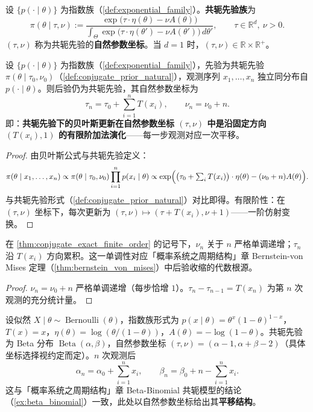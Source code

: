 \begin{definition}[共轭先验与自然参数坐标]\label{def:conjugate_prior_natural}
设 $\{p(\cdot\mid\theta)\}$ 为指数族（\cref{def:exponential_family}）。\textbf{共轭先验族}为
\[
\pi(\theta\mid\tau,\nu) := \frac{\exp\bigl(\tau\cdot\eta(\theta) - \nu A(\theta)\bigr)}{\int_\Theta \exp\bigl(\tau\cdot\eta(\theta') - \nu A(\theta')\bigr)\,d\theta'}, \qquad \tau\in\mathbb{R}^d,\ \nu>0.
\]
$(\tau,\nu)$ 称为共轭先验的\textbf{自然参数坐标}。当 $d=1$ 时，$(\tau,\nu)\in\mathbb{R}\times\mathbb{R}^+$。
\end{definition}

\begin{theorem}[共轭先验下贝叶斯更新的精确有限阶演化]\label{thm:conjugate_exact_finite_order}
设 $\{p(\cdot\mid\theta)\}$ 为指数族（\cref{def:exponential_family}），先验为共轭先验 $\pi(\theta\mid\tau_0,\nu_0)$（\cref{def:conjugate_prior_natural}），观测序列 $x_1,\dots,x_n$ 独立同分布自 $p(\cdot\mid\theta)$。则后验仍为共轭先验，其自然参数坐标为
\[
\boxed{\ \tau_n = \tau_0 + \sum_{i=1}^n T(x_i), \qquad \nu_n = \nu_0 + n.\ }
\]
即：\textbf{共轭先验下的贝叶斯更新在自然参数坐标 $(\tau,\nu)$ 中是沿固定方向 $(T(x_i),1)$ 的有限阶加法演化}——每一步观测对应一次平移。
\end{theorem}

\begin{proof}
由贝叶斯公式与共轭先验定义：
\[
\pi(\theta\mid x_1,\dots,x_n) \propto \pi(\theta\mid\tau_0,\nu_0)\prod_{i=1}^n p(x_i\mid\theta) \propto \exp\Bigl(\bigl(\tau_0 + \textstyle\sum_i T(x_i)\bigr)\cdot\eta(\theta) - (\nu_0+n)A(\theta)\Bigr).
\]
与共轭先验形式（\cref{def:conjugate_prior_natural}）对比即得。有限阶性：在 $(\tau,\nu)$ 坐标下，每次更新为 $(\tau,\nu)\mapsto(\tau+T(x_i), \nu+1)$——一阶仿射变换。
\end{proof}

\begin{corollary}[自然参数的单调累积]\label{cor:natural_parameter_monotone}
在 \cref{thm:conjugate_exact_finite_order} 的记号下，$\nu_n$ 关于 $n$ 严格单调递增；$\tau_n$ 沿 $T(x_i)$ 方向累积。这一单调性对应「概率系统之周期结构」章 Bernstein-von Mises 定理（\cref{thm:bernstein_von_mises}）中后验收缩的代数根源。
\end{corollary}

\begin{proof}
$\nu_n = \nu_0+n$ 严格单调递增（每步恰增 $1$）。$\tau_n - \tau_{n-1} = T(x_n)$ 为第 $n$ 次观测的充分统计量。
\end{proof}

\begin{example}\label{ex:beta_binomial_exact}
设似然 $X\mid\theta\sim\operatorname{Bernoulli}(\theta)$，指数族形式为 $p(x\mid\theta) = \theta^x(1-\theta)^{1-x}$，$T(x)=x$，$\eta(\theta) = \log(\theta/(1-\theta))$，$A(\theta) = -\log(1-\theta)$。共轭先验为 Beta 分布 $\operatorname{Beta}(\alpha,\beta)$，自然参数坐标 $(\tau,\nu) = (\alpha-1, \alpha+\beta-2)$（具体坐标选择视约定而定）。$n$ 次观测后
\[
\alpha_n = \alpha_0 + \sum_{i=1}^n x_i, \qquad \beta_n = \beta_0 + n - \sum_{i=1}^n x_i.
\]
这与「概率系统之周期结构」章 Beta-Binomial 共轭模型的结论（\cref{ex:beta_binomial}）一致，此处以自然参数坐标给出其\textbf{平移结构}。
\end{example}

